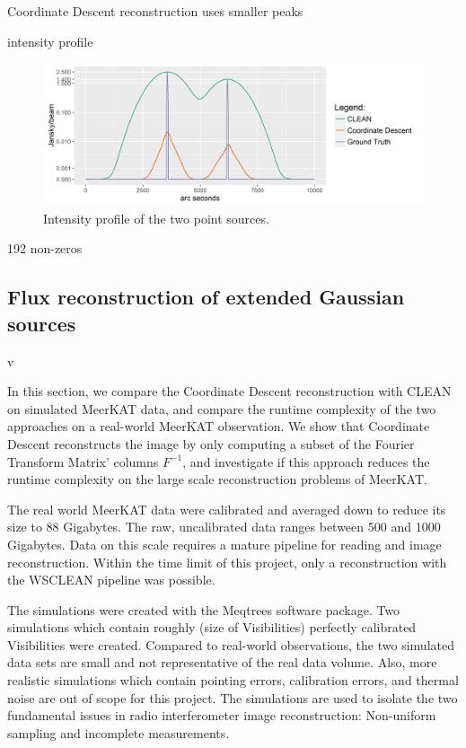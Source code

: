 Coordinate Descent reconstruction uses smaller peaks 


intensity profile


\begin{figure}[h]
	\centering
	\includegraphics[width=0.8\linewidth]{./chapters/20.results/points/contour_points.png}
	\caption{Intensity profile of the two point sources.}
	\label{results:points:contour}
\end{figure}

192 non-zeros

\subsection{Flux reconstruction of extended Gaussian sources}



v


In this section, we compare the Coordinate Descent reconstruction with CLEAN on simulated MeerKAT data, and compare the runtime complexity of the two approaches on a real-world MeerKAT observation. We show that Coordinate Descent reconstructs the image by only computing a subset of the Fourier Transform Matrix' columns $F^{-1}$, and investigate if this approach reduces the runtime complexity on the large scale reconstruction problems of MeerKAT.


The real world MeerKAT data were calibrated and averaged down to reduce its size to 88 Gigabytes. The raw, uncalibrated data ranges between 500 and 1000 Gigabytes. Data on this scale requires a mature pipeline for reading and image reconstruction. Within the time limit of this project, only a reconstruction with the WSCLEAN\cite{offringa2014wsclean} pipeline was possible.

The simulations were created with the Meqtrees software package. Two simulations which contain roughly (size of Visibilities) perfectly calibrated Visibilities were created. Compared to real-world observations, the two simulated data sets are small and not representative of the real data volume. Also, more realistic simulations which contain pointing errors, calibration errors, and thermal noise are out of scope for this project. The simulations are used to isolate the two fundamental issues in radio interferometer image reconstruction: Non-uniform sampling and incomplete measurements.

